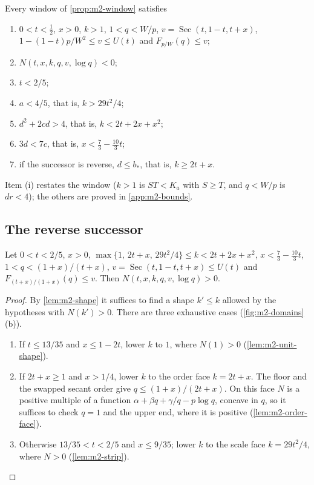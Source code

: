 \begin{lemma}\label{lem:m2-necessary}
Every window of \cref{prop:m2-window} satisfies
\begin{enumerate}[label=(\roman*)]
\item $0<t<\frac12$, $x>0$, $k>1$, $1<q<W/p$, $v=\operatorname{Sec}(t,1-t,t+x)$,
$1-(1-t)p/W^2\le v\le U(t)$ and $F_{p/W}(q)\le v$;
\item $N(t,x,k,q,v,\log q)<0$;
\item $t<2/5$;
\item $a<4/5$, that is, $k>29t^2/4$;
\item $d^2+2cd>4$, that is, $k<2t+2x+x^2$;
\item $3d<7c$, that is, $x<\frac73-\frac{10}3t$;
\item if the successor is reverse, $d\le b_*$, that is, $k\ge2t+x$.
\end{enumerate}
\end{lemma}

Item (i) restates the window ($k>1$ is $ST<K_a$ with $S\ge T$, and $q<W/p$ is $dr<4$); the
others are proved in \cref{app:m2-bounds}.

\subsection{The reverse successor}\label{sec:m2-reverse}

\begin{proposition}\label{prop:m2-reverse-core}
Let $0<t<2/5$, $x>0$, $\max\{1,\,2t+x,\,29t^2/4\}\le k<2t+2x+x^2$, $x<\frac73-\frac{10}3t$,
$1<q<(1+x)/(t+x)$, $v=\operatorname{Sec}(t,1-t,t+x)\le U(t)$ and $F_{(t+x)/(1+x)}(q)\le v$.
Then $N(t,x,k,q,v,\log q)>0$.
\end{proposition}

\begin{proof}
By \cref{lem:m2-shape} it suffices to find a shape $k'\le k$ allowed by the hypotheses with
$N(k')>0$. There are three exhaustive cases (\cref{fig:m2-domains}(b)).
\begin{enumerate}[label=(\arabic*)]
\item If $t\le13/35$ and $x\le1-2t$, lower $k$ to $1$, where $N(1)>0$ (\cref{lem:m2-unit-shape}).
\item If $2t+x\ge1$ and $x>1/4$, lower $k$ to the order face $k=2t+x$. The floor and the swapped
secant order give $q\le(1+x)/(2t+x)$. On this face $N$ is a positive
multiple of a function $\alpha+\beta q+\gamma/q-p\log q$, concave in $q$, so it suffices to check
$q=1$ and the upper end, where it is positive (\cref{lem:m2-order-face}).
\item Otherwise $13/35<t<2/5$ and $x\le9/35$; lower $k$ to the scale face $k=29t^2/4$, where
$N>0$ (\cref{lem:m2-strip}).\qedhere
\end{enumerate}
\end{proof}

